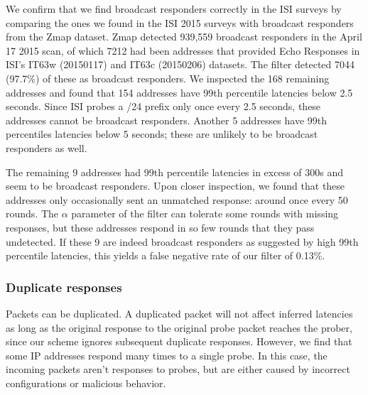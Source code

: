 We confirm that we find broadcast responders correctly in the
ISI surveys by comparing the ones we found in the ISI 2015 surveys
with broadcast responders from the Zmap dataset.
%
%
%
%
Zmap detected 939,559 broadcast responders in the April 17
2015 scan, of which 7212 had been
addresses that provided Echo Responses in ISI's IT63w (20150117) and
IT63c (20150206) datasets.
%
The filter detected 7044 (97.7\%) of these as broadcast responders. 
We inspected the 168 remaining addresses and found that 154 addresses
have 99th percentile latencies below 2.5 seconds. Since ISI
probes a /24 prefix only once every 2.5 seconds, these addresses
cannot be broadcast responders. Another 5 addresses have 99th
percentiles latencies below 5 seconds; these are unlikely to be
broadcast responders as well.

The remaining 9 addresses had 99th percentile latencies in excess of
300s and seem to be broadcast responders. Upon closer inspection, we
found that these addresses only occasionally sent an unmatched
response: around once every 50 rounds. The $\alpha$ parameter of the
filter can tolerate some rounds with missing responses, but these
addresses respond in so few rounds that they pass undetected. 
If these 9 are indeed broadcast responders as suggested by high 99th percentile latencies, this yields a false negative rate of our filter of 0.13\%.

\subsubsection{Duplicate responses}

Packets can be duplicated.  A duplicated packet will not affect inferred latencies as
long as the original response to the original probe packet reaches the prober, since our scheme
ignores subsequent duplicate responses. However, we find that some IP
addresses respond many times to a single probe. In this case, the incoming packets aren't responses to
probes, but are either caused by incorrect configurations or malicious
behavior. 

